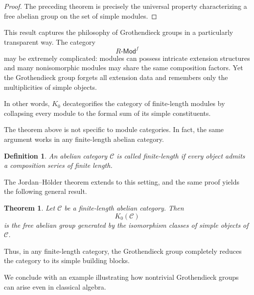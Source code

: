 \documentclass[12pt,reqno]{amsart}
\theoremstyle{plain}
\newtheorem{defn}[thm]{Definition}
\numberwithin{equation}{section}
\newtheorem{theorem}{Theorem}[section]
\begin{document}
\begin{proof}
The preceding theorem is precisely the universal property characterizing a free abelian group on the set of simple modules.
\end{proof}

This result captures the philosophy of Grothendieck groups in a particularly transparent way. The category
\[
R\textsf{-Mod}^f
\]
may be extremely complicated: modules can possess intricate extension structures and many nonisomorphic modules may share the same composition factors. Yet the Grothendieck group forgets all extension data and remembers only the multiplicities of simple objects.

In other words, $K_0$ decategorifies the category of finite-length modules by collapsing every module to the formal sum of its simple constituents.

The theorem above is not specific to module categories. In fact, the same argument works in any finite-length abelian category.

\begin{defn}
An abelian category $\mathcal C$ is called \emph{finite-length} if every object admits a composition series of finite length.
\end{defn}

The Jordan--H\"older theorem extends to this setting, and the same proof yields the following general result.

\begin{theorem}
Let $\mathcal C$ be a finite-length abelian category. Then
\[
K_0(\mathcal C)
\]
is the free abelian group generated by the isomorphism classes of simple objects of $\mathcal C$.
\end{theorem}

Thus, in any finite-length category, the Grothendieck group completely reduces the category to its simple building blocks.

We conclude with an example illustrating how nontrivial Grothendieck groups can arise even in classical algebra.
\end{document}
